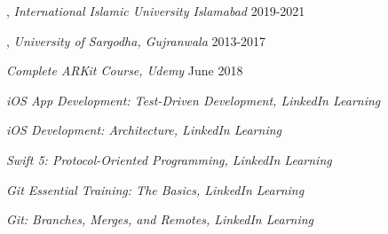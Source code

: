
, \textit{International Islamic University Islamabad}	\hfill 2019-2021

, \textit{University of Sargodha, Gujranwala} \hfill	2013-2017

\textit{Complete ARKit Course, Udemy} 	\hfill June 2018%

\textit{iOS App Development: Test-Driven Development, LinkedIn Learning}%

\textit{iOS Development: Architecture, LinkedIn Learning}%

\textit{Swift 5: Protocol-Oriented Programming, LinkedIn Learning}%

\textit{Git Essential Training: The Basics, LinkedIn Learning}%

\textit{Git: Branches, Merges, and Remotes, LinkedIn Learning}%


